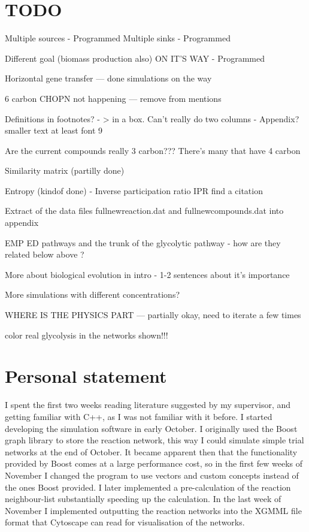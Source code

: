 \documentclass[a4paper,12pt]{article}
\begin{document}
	\section*{TODO}
	\label{sec:todo}
	
	Multiple sources - Programmed
	Multiple sinks - Programmed

	Different goal (biomass production also) ON IT'S WAY - Programmed

	Horizontal gene transfer --- done simulations on the way

	6 carbon CHOPN not happening --- remove from mentions

	Definitions in footnotes? - > in a box. Can't really do two columns - Appendix? smaller text at least font 9

	Are the current compounds really 3 carbon??? There's many that have 4 carbon

	Similarity matrix (partilly done)

	Entropy (kindof done) - Inverse participation ratio  IPR find a citation

	Extract of the data files fullnewreaction.dat and fullnewcompounds.dat into appendix

	EMP ED pathways and the trunk of the glycolytic pathway - how are they related below above ?

	More about biological evolution in intro - 1-2 sentences about it's importance

	More simulations with different concentrations?

	WHERE IS THE PHYSICS PART --- partially okay, need to iterate a few times

	color real glycolysis in the networks shown!!!


	\newpage
	\section*{Personal statement}
	I spent the first two weeks reading literature suggested by my supervisor, and getting familiar with C++, as I was not familiar with it before. 
	I started developing the simulation software in early October. 	I originally used the Boost graph library to store the reaction network, this way I could simulate simple trial networks at the end of October. It became apparent then that the functionality provided by Boost comes at a large performance cost, so in the first few weeks of November I changed the program to use vectors and custom concepts instead of the ones Boost provided. I later implemented a pre-calculation of the reaction neighbour-list substantially speeding up the calculation. 
	In the last week of November I implemented outputting the reaction networks into the XGMML file format that Cytoscape can read for visualisation of the networks. 
\end{document}
